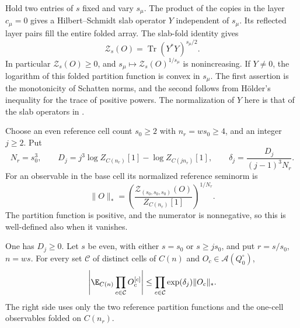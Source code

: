 Hold two entries of $s$ fixed and vary $s_\mu$.
The product of the copies in the layer $c_\mu=0$ gives
a Hilbert--Schmidt slab operator $Y$ independent of $s_\mu$.
Its reflected layer pairs fill the entire folded array.
The slab-fold identity \cite[Proposition~4.2, (66)]{ChamberLattice} gives
\begin{equation}\label{eq:transfer-fold-trace}
 \mathcal Z_s(O)=\operatorname{Tr}(Y^*Y)^{s_\mu/2}.
\end{equation}
In particular $\mathcal Z_s(O)\ge0$, and
$s_\mu\mapsto\mathcal Z_s(O)^{1/s_\mu}$ is nonincreasing.
If $Y\ne0$, the logarithm of this folded partition function
is convex in $s_\mu$. The first assertion is the monotonicity
of Schatten norms, and the second follows from H\"older's
inequality for the trace of positive powers.
The normalization of $Y$ here is that of the slab operators
in \cite[\S4.3]{ChamberLattice}.

Choose an even reference cell count $s_0\ge2$ with
$n_r=ws_0\ge4$, and an integer $j\ge2$. Put
\begin{equation}\label{eq:transfer-reference-data}
 N_r=s_0^3,\qquad
 D_j=j^3\log Z_{C(n_r)}[1]-\log Z_{C(jn_r)}[1],
 \qquad \delta_j=\frac{D_j}{(j-1)^3N_r}.
\end{equation}
For an observable in the base cell its normalized reference
seminorm is
\begin{equation}\label{eq:transfer-reference-seminorm}
 \|O\|_*=
 \left(\frac{\mathcal Z_{(s_0,s_0,s_0)}(O)}
                    {Z_{C(n_r)}[1]}\right)^{1/N_r}.
\end{equation}
The partition function is positive, and the numerator is
nonnegative, so this is well-defined also when it vanishes.

\begin{proposition}\label{prop:transfer-general}
One has $D_j\ge0$. Let $s$ be even, with either $s=s_0$
or $s\ge js_0$, and put $r=s/s_0$, $n=ws$.
For every set $\mathcal C$ of distinct cells of $C(n)$ and
$O_c\in\mathcal A(Q_0^\circ)$,
\begin{equation}\label{eq:transfer-general}
 \left|\E_{C(n)}\prod_{c\in\mathcal C}O_c^{[c]}\right|
                    \le\prod_{c\in\mathcal C}\exp(\delta_j)\|O_c\|_*.
\end{equation}
The right side uses only the two reference partition functions
and the one-cell observables folded on $C(n_r)$.
\end{proposition}

